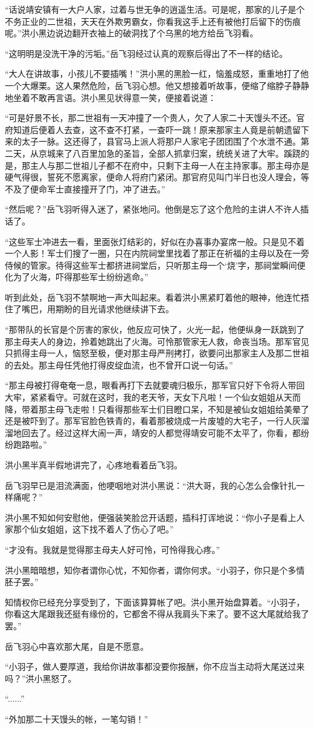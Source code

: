 “话说靖安镇有一大户人家，过着与世无争的逍遥生活。可是呢，那家的儿子是个不务正业的二世祖，天天在外欺男霸女，你看我这手上还有被他打后留下的伤痕呢。”洪小黑边说边翻开衣袖上的破洞找了个乌黑的地方给岳飞羽看。

“这明明是没洗干净的污垢。”岳飞羽经过认真的观察后得出了不一样的结论。

“大人在讲故事，小孩儿不要插嘴！”洪小黑的黑脸一红，恼羞成怒，重重地打了他一个大爆栗。这人果然危险，岳飞羽心想。他又想接着听故事，便缩了缩脖子静静地坐着不敢再言语。洪小黑见状得意一笑，便接着说道：

“可是好景不长，那二世祖有一天冲撞了一个贵人，欠了人家二十天馒头不还。官府知道后便着人去查，这不查不打紧，一查吓一跳！原来那家主人竟是前朝遗留下来的太子一脉。这还得了，县官马上派人将那户人家宅子团团围了个水泄不通。第二天，从京城来了八百里加急的圣旨，全部人抓拿归案，统统关进了大牢。蹊跷的是，那主人与那二世祖儿子都不在府中，只剩下主母一人在主持家事。那主母亦是硬气得很，誓死不愿离家，便命人将府门紧闭。那官府见叫门半日也没人理会，等不及了便命军士直接撞开了门，冲了进去。”

“然后呢？”岳飞羽听得入迷了，紧张地问。他倒是忘了这个危险的主讲人不许人插话了。

“这些军士冲进去一看，里面张灯结彩的，好似在办喜事办宴席一般。只是见不着一个人影！军士们搜了一圈，只在内院祠堂里找着了那正在祈福的主母以及在一旁侍候的管家。待得这些军士都挤进祠堂后，只听那主母一个‘烧’字，那祠堂瞬间便化为了火海，吓得那些军士纷纷逃命。”

听到此处，岳飞羽不禁啊地一声大叫起来。看着洪小黑紧盯着他的眼神，他连忙捂住了嘴巴，用期盼的目光请求他继续讲下去。

“那带队的长官是个厉害的家伙，他反应可快了，火光一起，他便纵身一跃跳到了那主母夫人的身边，拎着她跳出了火海。可怜那管家无人救，命丧当场。那军官见只抓得主母一人，恼怒至极，便对那主母严刑拷打，欲要问出那家主人及那二世祖的去处。那主母任凭他打得皮绽血流，也不曾开口说一句话。”

“那主母被打得奄奄一息，眼看再打下去就要魂归极乐，那军官只好下令将人带回大牢，紧紧看守。可就在这时，我的老天爷，天女下凡啦！一个仙女姐姐从天而降，带着那主母飞走啦！只看得那些军士们目瞪口呆，不知是被仙女姐姐给美晕了还是被吓到了。那军官脸色铁青的，看着那被烧成一片废墟的大宅子，一行人灰溜溜地回去了。经过这样大闹一声，靖安的人都觉得靖安可能不太平了，你看，都纷纷跑路啦。”

洪小黑半真半假地讲完了，心疼地看着岳飞羽。

岳飞羽早已是泪流满面，他哽咽地对洪小黑说：“洪大哥，我的心怎么会像针扎一样痛呢？”

洪小黑不知如何安慰他，便强装笑脸岔开话题，插科打诨地说：“你小子是看上人家那个仙女姐姐，这下找不着人了伤心了吧。”

“才没有。我就是觉得那主母夫人好可怜，可怜得我心疼。”

洪小黑暗暗想，知你者谓你心忧，不知你者，谓你何求。“小羽子，你只是个多情胚子罢。”

知情权你已经充分享受到了，下面该算算帐了吧。洪小黑开始盘算着。“小羽子，你看这大尾跟我还挺有缘份的，它都舍不得从我肩头下来了。要不这大尾就给我了罢。”

岳飞羽心中喜欢那大尾，自是不愿意。

“小羽子，做人要厚道，我给你讲故事都没要你报酬，你不应当主动将大尾送过来吗？”洪小黑怒了。

“......”

“外加那二十天馒头的帐，一笔勾销！”
